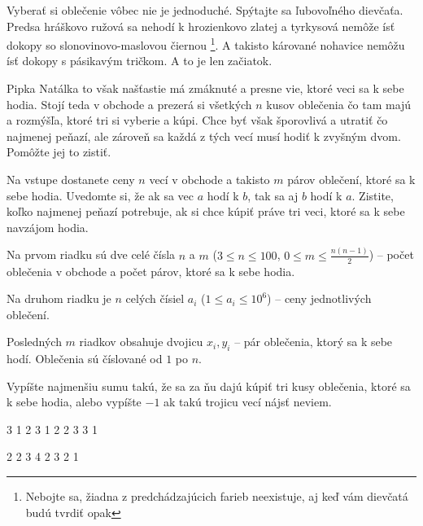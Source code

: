 




Vyberať si oblečenie vôbec nie je jednoduché. Spýtajte sa ľubovoľného dievčaťa. Predsa hráškovo
ružová sa nehodí k hrozienkovo zlatej a tyrkysová nemôže ísť dokopy so slonovinovo-maslovou čiernou
\footnote{Nebojte sa, žiadna z predchádzajúcich farieb neexistuje, aj keď vám dievčatá budú tvrdiť
opak}. A takisto kárované nohavice nemôžu ísť dokopy s pásikavým tričkom. A to je len začiatok.

Pipka Natálka to však našťastie má zmáknuté a presne vie, ktoré veci sa k sebe hodia. Stojí teda v
obchode a prezerá si všetkých $n$ kusov oblečenia čo tam majú a rozmýšľa, ktoré tri si vyberie a
kúpi. Chce byť však šporovlivá a utratiť čo najmenej peňazí, ale zároveň sa každá z tých vecí musí
hodiť k zvyšným dvom. Pomôžte jej to zistiť.


Na vstupe dostanete ceny $n$ vecí v obchode a takisto $m$ párov oblečení, ktoré sa k sebe hodia.
Uvedomte si, že ak sa vec $a$ hodí k $b$, tak sa aj $b$ hodí k $a$. Zistite, koľko najmenej peňazí
potrebuje, ak si chce kúpiť práve tri veci, ktoré sa k sebe navzájom hodia.


Na prvom riadku sú dve celé čísla $n$ a $m$ ($3 \leq n \leq 100$, $0 \leq m \leq \frac{n(n-1)}{2}$)
-- počet oblečenia v obchode a počet párov, ktoré sa k sebe hodia.

Na druhom riadku je $n$ celých čísiel $a_i$ ($1 \leq a_i \leq 10^6$) -- ceny jednotlivých oblečení.

Posledných $m$ riadkov obsahuje dvojicu $x_i, y_i$ -- pár oblečenia, ktorý sa k sebe hodí. Oblečenia
sú číslované od $1$ po $n$.


Vypíšte najmenšiu sumu takú, že sa za ňu dajú kúpiť tri kusy oblečenia, ktoré sa k sebe hodia, alebo
vypíšte $-1$ ak takú trojicu vecí nájsť neviem.


 3
1 2 3
1 2
2 3
3 1
\koniec

 2
2 3 4
2 3
2 1
\koniec


